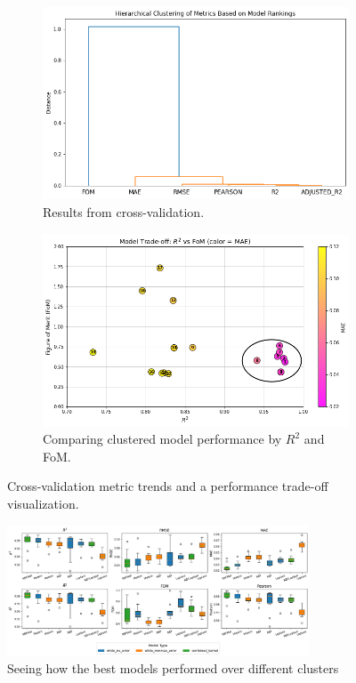 \documentclass{article}
\begin{document}
\begin{figure}[H]
    \centering
    \begin{subfigure}[t]{0.48\textwidth}
        \centering
        \includegraphics[width=\textwidth]{LatexPlots/CV_plots/clustermetrics.png}
        \caption{Results from cross-validation.}
        \label{fig:CVoverallmodels}
    \end{subfigure}
    \hfill
    \begin{subfigure}[t]{0.48\textwidth}
        \centering
        \includegraphics[width=\textwidth]{LatexPlots/CV_plots/r2vsfom.png}
        \caption{Comparing clustered model performance by $R^2$ and FoM.}
        \label{fig:r2vsfom}
    \end{subfigure}
    \caption{Cross-validation metric trends and a performance trade-off visualization.}
    \label{fig:CV_sidebyside}
\end{figure}


\begin{figure}[H]
    \centering
    \includegraphics[width=0.8\textwidth]{LatexPlots/CV_plots/boxplots.png}
    \caption{Seeing how the best models performed over different clusters}
    \label{fig:boxplots}
\end{figure}
\end{document}
